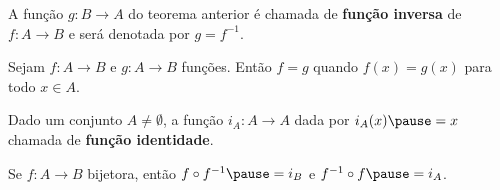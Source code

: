 \documentclass{beamer}
\begin{document}
    \begin{frame}
        \begin{definicao}
            A fun\c{c}\~ao $g : B \to A$ \pause do teorema anterior \pause \'e chamada de \textbf{fun\c{c}\~ao inversa} \pause de $f : A \to B$ \pause e ser\'a denotada por $g = f^{-1}$.\pause
        \end{definicao}

        \vspace{.3cm}

        \begin{definicao}
            Sejam $f : A \to B$ \pause e $g : A \to B$ fun\c{c}\~oes. \pause Ent\~ao $f = g$ \pause quando $f(x) = g(x)$ \pause para todo $x \in A$.\pause
        \end{definicao}

        \vspace{.3cm}

        \begin{definicao}
            Dado um conjunto $A \ne \emptyset$, \pause a fun{\c c}{\~a}o $i_{A}: A \to A$ \pause dada por $i_{A}(x) \pause = x$  chamada de \pause \textbf{fun{\c c}{\~a}o identidade}.
        \end{definicao}
    \end{frame}

    \begin{frame}
        \begin{proposicao}
            Se $f : A \to B$  bijetora, \pause ent{\~a}o $f\circ f^{-1} \pause = i_{B}$ \pause e $f^{-1}\circ f \pause = i_{A}$.
        \end{proposicao}
    \end{frame}
\end{document}
